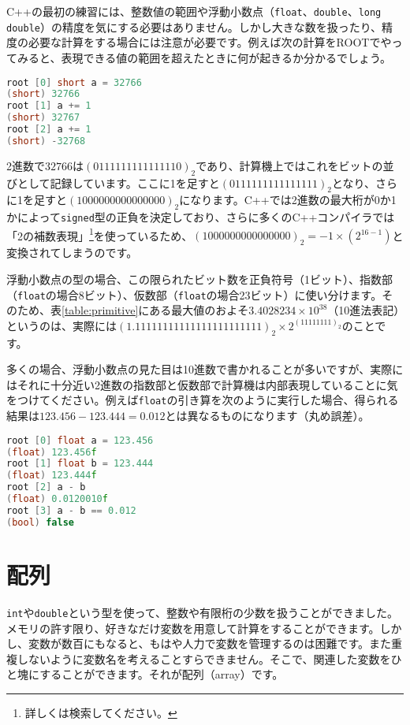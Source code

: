 C++の最初の練習には、整数値の範囲や浮動小数点（\texttt{float}、\texttt{double}、\texttt{long double}）の精度を気にする必要はありません。しかし大きな数を扱ったり、精度の必要な計算をする場合には注意が必要です。例えば次の計算をROOTでやってみると、表現できる値の範囲を超えたときに何が起きるか分かるでしょう。
\begin{lstlisting}[language=c++]
root [0] short a = 32766
(short) 32766
root [1] a += 1
(short) 32767
root [2] a += 1
(short) -32768
\end{lstlisting}
2進数で$32766$は$(0111111111111110)_2$であり、計算機上ではこれをビットの並びとして記録しています。ここに1を足すと$(0111111111111111)_2$となり、さらに1を足すと$(1000000000000000)_2$になります。C++では2進数の最大桁が0か1かによって\texttt{signed}型の正負を決定しており、さらに多くのC++コンパイラでは「2の補数表現」\footnote{詳しくは検索してください。}を使っているため、$(1000000000000000)_2=-1\times(2^{16-1})$と変換されてしまうのです。

浮動小数点の型の場合、この限られたビット数を正負符号（1ビット）、指数部（\texttt{float}の場合8ビット）、仮数部（\texttt{float}の場合23ビット）に使い分けます。そのため、表\ref{table:primitive}にある最大値のおよそ$3.4028234\times10^{38}$（10進法表記）というのは、実際には$(1.11111111111111111111111)_2\times2^{(11111111)_2}$のことです。

多くの場合、浮動小数点の見た目は10進数で書かれることが多いですが、実際にはそれに十分近い2進数の指数部と仮数部で計算機は内部表現していることに気をつけてください。例えば\texttt{float}の引き算を次のように実行した場合、得られる結果は$123.456-123.444=0.012$とは異なるものになります（丸め誤差）。

\begin{lstlisting}[language=c++]
root [0] float a = 123.456
(float) 123.456f
root [1] float b = 123.444
(float) 123.444f
root [2] a - b
(float) 0.0120010f
root [3] a - b == 0.012
(bool) false
\end{lstlisting}

\section{配列}
\label{sec:arrays}
\texttt{int}や\texttt{double}という型を使って、整数や有限桁の少数を扱うことができました。メモリの許す限り、好きなだけ変数を用意して計算をすることができます。しかし、変数が数百にもなると、もはや人力で変数を管理するのは困難です。また重複しないように変数名を考えることすらできません。そこで、関連した変数をひと塊にすることができます。それが配列（array）です。

